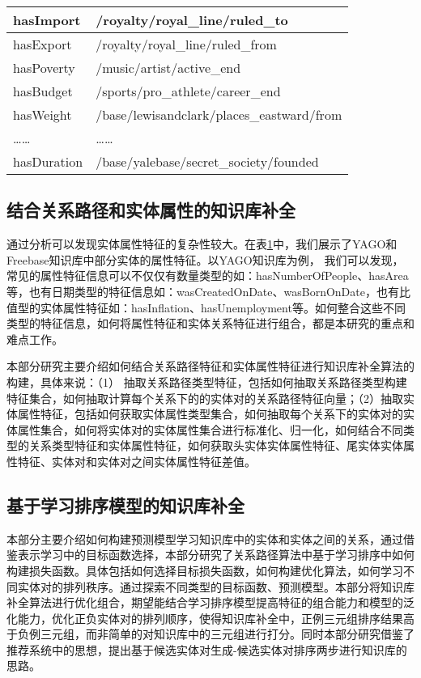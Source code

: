 \begin{table}[htbp]
\begin{tabular}{|l|l|}
    hasImport  & /royalty/royal\_line/ruled\_to \\
    \hline
    hasExport  & /royalty/royal\_line/ruled\_from \\
    \hline
    hasPoverty  & /music/artist/active\_end \\
    \hline
    hasBudget  & /sports/pro\_athlete/career\_end \\
    \hline
    hasWeight  & /base/lewisandclark/places\_eastward/from \\
    \hline
    ……  & ……\\
    \hline
    hasDuration  & /base/yalebase/secret\_society/founded \\
    \hline
    \end{tabular}%
  \label{tab:addlabel-attr}%
\end{table}%

\subsection{结合关系路径和实体属性的知识库补全}
通过分析可以发现实体属性特征的复杂性较大。在表\ref{tab:addlabel-attr}中，我们展示了YAGO和Freebase知识库中部分实体的属性特征。以YAGO知识库为例，
我们可以发现，常见的属性特征信息可以不仅仅有数量类型的如：hasNumberOfPeople、hasArea等，也有日期类型的特征信息如：wasCreatedOnDate、wasBornOnDate，也有比值型的实体属性特征如：hasInflation、hasUnemployment等。如何整合这些不同类型的特征信息，如何将属性特征和实体关系特征进行组合，都是本研究的重点和难点工作。

本部分研究主要介绍如何结合关系路径特征和实体属性特征进行知识库补全算法的构建，具体来说：（1）
抽取关系路径类型特征，包括如何抽取关系路径类型构建特征集合，如何抽取计算每个关系下的的实体对的关系路径特征向量；（2）抽取实体属性特征，包括如何获取实体属性类型集合，如何抽取每个关系下的实体对的实体属性集合，如何将实体对的实体属性集合进行标准化、归一化，如何结合不同类型的关系类型特征和实体属性特征，如何获取头实体实体属性特征、尾实体实体属性特征、实体对和实体对之间实体属性特征差值。

\subsection{基于学习排序模型的知识库补全}
本部分主要介绍如何构建预测模型学习知识库中的实体和实体之间的关系，通过借鉴表示学习中的目标函数选择，本部分研究了关系路径算法中基于学习排序中如何构建损失函数。具体包括如何选择目标损失函数，如何构建优化算法，如何学习不同实体对的排列秩序。通过探索不同类型的目标函数、预测模型。本部分将知识库补全算法进行优化组合，期望能结合学习排序模型提高特征的组合能力和模型的泛化能力，优化正负实体对的排列顺序，使得知识库补全中，正例三元组排序结果高于负例三元组，而非简单的对知识库中的三元组进行打分。同时本部分研究借鉴了推荐系统中的思想，提出基于候选实体对生成-候选实体对排序两步进行知识库的思路。

